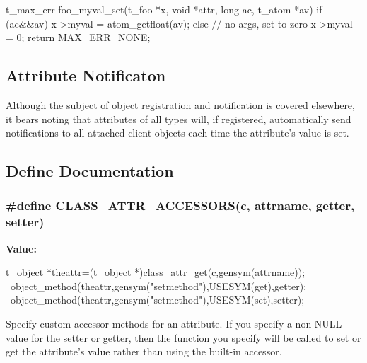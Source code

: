 \begin{DoxyCode}
    t_max_err foo_myval_set(t_foo *x, void *attr, long ac, t_atom *av) 
    {
       if (ac&&av) {
          x->myval = atom_getfloat(av);
       } else {
          // no args, set to zero
          x->myval = 0;
       }
       return MAX_ERR_NONE;
    }
\end{DoxyCode}
\hypertarget{group__attr_attribute_change_notification}{}\subsection{Attribute Notificaton}\label{group__attr_attribute_change_notification}
Although the subject of object registration and notification is covered elsewhere, it bears noting that attributes of all types will, if registered, automatically send notifications to all attached client objects each time the attribute's value is set. 

\subsection{Define Documentation}
\hypertarget{group__attr_ga51b1e8466f45d86683437a77be600fb8}{
\subsubsection[{CLASS\_\-ATTR\_\-ACCESSORS}]{\setlength{\rightskip}{0pt plus 5cm}\#define CLASS\_\-ATTR\_\-ACCESSORS(c, \/  attrname, \/  getter, \/  setter)}}
\label{group__attr_ga51b1e8466f45d86683437a77be600fb8}
{\bfseries Value:}
\begin{DoxyCode}
{ t_object *theattr=(t_object *)class_attr_get(c,gensym(attrname)); \
        object_method(theattr,gensym("setmethod"),USESYM(get),getter); \
        object_method(theattr,gensym("setmethod"),USESYM(set),setter); }
\end{DoxyCode}


Specify custom accessor methods for an attribute. If you specify a non-\/NULL value for the setter or getter, then the function you specify will be called to set or get the attribute's value rather than using the built-\/in accessor.


